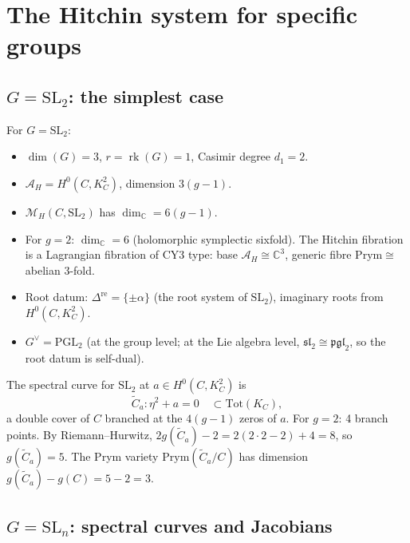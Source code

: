 \documentclass[11pt]{article}
\theoremstyle{definition}
\theoremstyle{remark}
\newcommand{\cA}{\mathcal{A}}
\newcommand{\cM}{\mathcal{M}}
\newcommand{\Prym}{\mathrm{Prym}}
\DeclareMathOperator{\rk}{rk}
\begin{document}
\section{The Hitchin system for specific groups}
\label{sec:specific-groups}

\subsection{$G = \mathrm{SL}_2$: the simplest case}

For $G = \mathrm{SL}_2$:
\begin{itemize}
 \item $\dim(G) = 3$, $r = \rk(G) = 1$, Casimir degree $d_1 = 2$.
 \item $\cA_H = H^0(C, K_C^2)$, dimension $3(g-1)$.
 \item $\cM_H(C, \mathrm{SL}_2)$ has $\dim_\mathbb{C} = 6(g-1)$.
 \item For $g = 2$: $\dim_\mathbb{C} = 6$ (holomorphic symplectic sixfold). The Hitchin fibration is a Lagrangian fibration of CY3 type: base $\cA_H \cong \mathbb{C}^3$, generic fibre $\Prym \cong$ abelian 3-fold.
 \item Root datum: $\Delta^{\mathrm{re}} = \{\pm \alpha\}$ (the root system of $\mathrm{SL}_2$), imaginary roots from $H^0(C, K_C^2)$.
 \item $G^\vee = \mathrm{PGL}_2$ (at the group level; at the Lie algebra level, $\mathfrak{sl}_2 \cong \mathfrak{pgl}_2$, so the root datum is self-dual).
\end{itemize}

The spectral curve for $\mathrm{SL}_2$ at $a \in H^0(C, K_C^2)$ is
\[
 \widetilde{C}_a \colon \eta^2 + a = 0 \quad \subset \text{Tot}(K_C),
\]
a double cover of $C$ branched at the $4(g-1)$ zeros of $a$. For $g = 2$: 4 branch points. By Riemann--Hurwitz, $2g(\widetilde{C}_a) - 2 = 2(2 \cdot 2 - 2) + 4 = 8$, so $g(\widetilde{C}_a) = 5$. The Prym variety $\Prym(\widetilde{C}_a/C)$ has dimension $g(\widetilde{C}_a) - g(C) = 5 - 2 = 3$.

\subsection{$G = \mathrm{SL}_n$: spectral curves and Jacobians}
\end{document}
